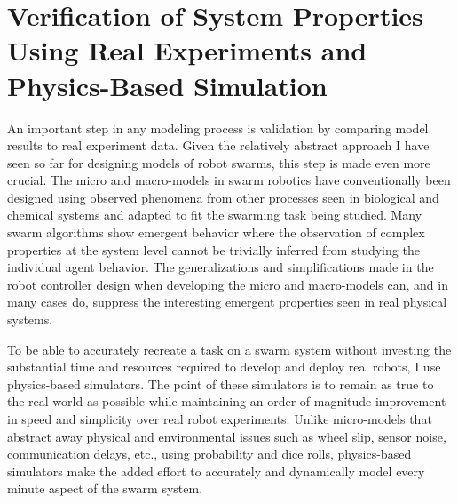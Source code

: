 \documentclass[defaultstyle,12pt]{proposal}
\begin{document}
\section{Verification of System Properties Using Real Experiments and Physics-Based Simulation}
An important step in any modeling process is validation by comparing model results to real experiment data. Given the relatively abstract approach I have seen so far for designing models of robot swarms, this step is made even more crucial. The micro and macro-models in swarm robotics have conventionally been designed using observed phenomena from other processes seen in biological and chemical systems and adapted to fit the swarming task being studied. Many swarm algorithms show emergent behavior where the observation of complex properties at the system level cannot be trivially inferred from studying the individual agent behavior. The generalizations and simplifications made in the robot controller design when developing the micro and macro-models can, and in many cases do, suppress the interesting emergent properties seen in real physical systems. 

To be able to accurately recreate a task on a swarm system without investing the substantial time and resources required to develop and deploy real robots, I use physics-based simulators. The point of these simulators is to remain as true to the real world as possible while maintaining an order of magnitude improvement in speed and simplicity over real robot experiments. Unlike micro-models that abstract away physical and environmental issues such as wheel slip, sensor noise, communication delays, etc., using probability and dice rolls, physics-based simulators make the added effort to accurately and dynamically model every minute aspect of the swarm system.
\end{document}
